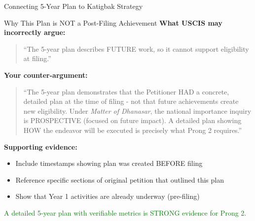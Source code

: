 \documentclass[11pt]{beamer}
\begin{document}
	\begin{frame}{Connecting 5-Year Plan to Katigbak Strategy}
		\scriptsize
		\begin{block}{Why This Plan is NOT a Post-Filing Achievement}
			\textbf{What USCIS may incorrectly argue:}
			\begin{quote}
				``The 5-year plan describes FUTURE work, so it cannot support eligibility at filing.''
			\end{quote}
			\textbf{Your counter-argument:}
			\begin{quote}
				``The 5-year plan demonstrates that the Petitioner HAD a concrete, detailed plan at the time of filing - not that future achievements create new eligibility. Under \textit{Matter of Dhanasar}, the national importance inquiry is PROSPECTIVE (focused on future impact). A detailed plan showing HOW the endeavor will be executed is precisely what Prong 2 requires.''
			\end{quote}
			\textbf{Supporting evidence:}
			\begin{itemize}
				\item Include timestamps showing plan was created BEFORE filing
				\item Reference specific sections of original petition that outlined this plan
				\item Show that Year 1 activities are already underway (pre-filing)
			\end{itemize}
			\textcolor{green}{A detailed 5-year plan with verifiable metrics is STRONG evidence for Prong 2.}
		\end{block}
	\end{frame}
	
\end{document}
